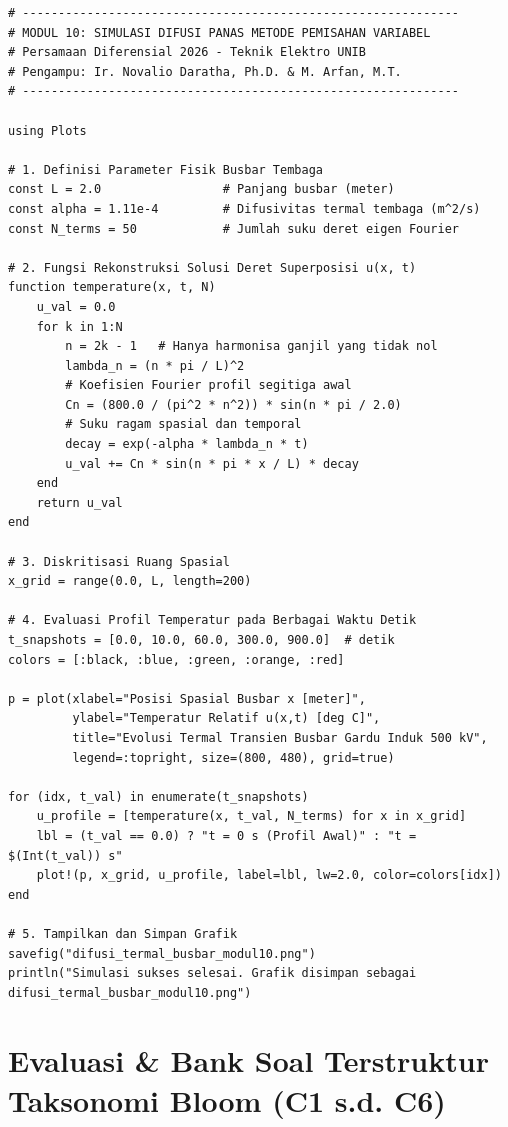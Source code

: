 \documentclass[11pt,a4paper]{article}
\theoremstyle{definition}
\begin{document}
\begin{lstlisting}[style=juliastyle, caption={Skrip Julia simulasi evolusi ruang-waktu difusi panas menggunakan superposisi deret eigen.}, label={lst:julia_heat_eigen}]
# -------------------------------------------------------------
# MODUL 10: SIMULASI DIFUSI PANAS METODE PEMISAHAN VARIABEL
# Persamaan Diferensial 2026 - Teknik Elektro UNIB
# Pengampu: Ir. Novalio Daratha, Ph.D. & M. Arfan, M.T.
# -------------------------------------------------------------

using Plots

# 1. Definisi Parameter Fisik Busbar Tembaga
const L = 2.0                 # Panjang busbar (meter)
const alpha = 1.11e-4         # Difusivitas termal tembaga (m^2/s)
const N_terms = 50            # Jumlah suku deret eigen Fourier

# 2. Fungsi Rekonstruksi Solusi Deret Superposisi u(x, t)
function temperature(x, t, N)
    u_val = 0.0
    for k in 1:N
        n = 2k - 1   # Hanya harmonisa ganjil yang tidak nol
        lambda_n = (n * pi / L)^2
        # Koefisien Fourier profil segitiga awal
        Cn = (800.0 / (pi^2 * n^2)) * sin(n * pi / 2.0)
        # Suku ragam spasial dan temporal
        decay = exp(-alpha * lambda_n * t)
        u_val += Cn * sin(n * pi * x / L) * decay
    end
    return u_val
end

# 3. Diskritisasi Ruang Spasial
x_grid = range(0.0, L, length=200)

# 4. Evaluasi Profil Temperatur pada Berbagai Waktu Detik
t_snapshots = [0.0, 10.0, 60.0, 300.0, 900.0]  # detik
colors = [:black, :blue, :green, :orange, :red]

p = plot(xlabel="Posisi Spasial Busbar x [meter]",
         ylabel="Temperatur Relatif u(x,t) [deg C]",
         title="Evolusi Termal Transien Busbar Gardu Induk 500 kV",
         legend=:topright, size=(800, 480), grid=true)

for (idx, t_val) in enumerate(t_snapshots)
    u_profile = [temperature(x, t_val, N_terms) for x in x_grid]
    lbl = (t_val == 0.0) ? "t = 0 s (Profil Awal)" : "t = $(Int(t_val)) s"
    plot!(p, x_grid, u_profile, label=lbl, lw=2.0, color=colors[idx])
end

# 5. Tampilkan dan Simpan Grafik
savefig("difusi_termal_busbar_modul10.png")
println("Simulasi sukses selesai. Grafik disimpan sebagai difusi_termal_busbar_modul10.png")
\end{lstlisting}

\section{Evaluasi \& Bank Soal Terstruktur Taksonomi Bloom (C1 s.d. C6)}
\end{document}
